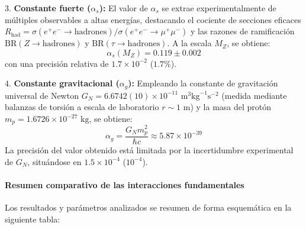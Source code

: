 \begin{problema}
3. \textbf{Constante fuerte ($\alpha_s$):}
El valor de $\alpha_s$ se extrae experimentalmente de múltiples observables a altas energías, destacando el cociente de secciones eficaces $R_{\text{had}} = \sigma(e^+e^- \to \text{hadrones}) / \sigma(e^+e^- \to \mu^+\mu^-)$ y las razones de ramificación $\text{BR}(Z \to \text{hadrones})$ y $\text{BR}(\tau \to \text{hadrones})$. A la escala $M_Z$, se obtiene:
\begin{equation}
\alpha_s(M_Z) = 0.119 \pm 0.002
\end{equation}
con una precisión relativa de $1.7 \times 10^{-2}$ ($1.7\%$).

4. \textbf{Constante gravitacional ($\alpha_g$):}
Empleando la constante de gravitación universal de Newton $G_N = 6.6742(10) \times 10^{-11}\text{ m}^3\text{kg}^{-1}\text{s}^{-2}$ (medida mediante balanzas de torsión a escala de laboratorio $r \sim 1\text{ m}$) y la masa del protón $m_p = 1.6726 \times 10^{-27}\text{ kg}$, se obtiene:
\begin{equation}
\alpha_g = \frac{G_N m_p^2}{\hbar c} \approx 5.87 \times 10^{-39}
\end{equation}
La precisión del valor obtenido está limitada por la incertidumbre experimental de $G_N$, situándose en $1.5 \times 10^{-4}$ ($10^{-4}$).

\begin{center}
\end{center}

\paragraph{Resumen comparativo de las interacciones fundamentales}

Los resultados y parámetros analizados se resumen de forma esquemática en la siguiente tabla:


\end{problema}
